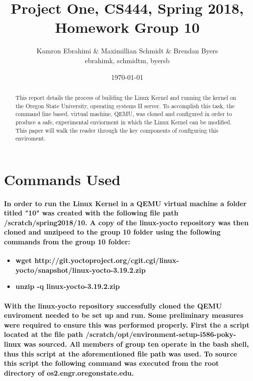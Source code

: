 \documentclass[10pt,onecolumn,draftclsnofoot]{article} %
\title{ Project One, CS444, Spring 2018, Homework Group 10}
\author{Kamron Ebrahimi \& Maximillian Schmidt \& Brendan Byers \\ ebrahimk, schmidtm, byersb }
\date{\today}
\begin{document}
\begin{titlingpage}
\maketitle
\begin{abstract}
This report details the process of building the Linux Kernel and running the kernel on the Oregon State University, operating systems II server. To accomplish this task, the command line based, virtual machine, QEMU, was cloned and configured in order to produce a safe, experimental enviorment in which the Linux Kernel can be modified. This paper will walk the reader through the key components of configuring this enviroment.     %
\end{abstract}
\end{titlingpage}


\tableofcontents

\newpage
\section{\bf  Commands Used}

  \paragraph{\normalfont \indent In order to run the Linux Kernel in a QEMU virtual machine a folder titled "10" was created with the following file path /scratch/spring2018/10. A copy of the linux-yocto repository was then cloned and unzipeed to the group 10 folder using the following commands from the group 10 folder:
  }

  \begin{itemize}
    \item \textbf{wget http://git.yoctoproject.org/cgit.cgi/linux-yocto/snapshot/linux-yocto-3.19.2.zip }
    \item \textbf{unzip -q linux-yocto-3.19.2.zip}
  \end{itemize}

  \paragraph{\normalfont With the linux-yocto repository successfully cloned the QEMU enviroment needed to be set up and run. Some preliminary measures were required to ensure this was performed properly. First the a script located at the file path /scratch/opt/environment-setup-i586-poky-linux was sourced. All members of group ten operate in the bash shell, thus this script at the aforementioned file path was used. To source this script the following command was executed from the root directory of os2.engr.oregonstate.edu.}
\end{document}
